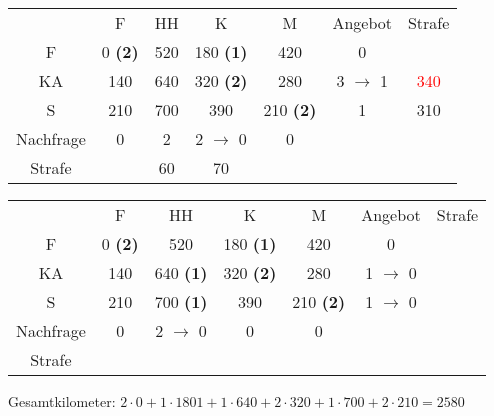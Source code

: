 \documentclass{article}
\begin{document}
	\begin{center}
		\begin{tabular}{c|cccc|cc}
			& \cellcolor{blue!30}F & HH & K & \cellcolor{blue!30}M & Angebot & Strafe \\
			\cline{1-6}
			\rowcolor{blue!30}F & \cellcolor{blue!30}0 \textbf{(2)} & 520 & 180 \textbf{(1)} & \cellcolor{blue!30}420 & 0 & \\
			KA & \cellcolor{blue!30}140 & 640 & 320 \textbf{(2)} & \cellcolor{blue!30}280 & 3 $\to$ 1 & \textcolor{red}{340} \\
			S & \cellcolor{blue!30}210 & 700 & 390 & \cellcolor{blue!30}210 \textbf{(2)} & 1 & 310 \\
			\cline{1-6}
			Nachfrage & \cellcolor{blue!30}0 & 2 & 2 $\to$ 0 & \cellcolor{blue!30}0 & & \\
			Strafe & \cellcolor{blue!30} & 60 & 70 & \cellcolor{blue!30} & & 
		\end{tabular}
	\end{center}
	\begin{center}
		\begin{tabular}{c|cccc|cc}
			& \cellcolor{blue!30}F & HH & \cellcolor{blue!30}K & \cellcolor{blue!30}M & Angebot & Strafe \\
			\cline{1-6}
			\rowcolor{blue!30}F & \cellcolor{blue!30}0 \textbf{(2)} & 520 & 180 \textbf{(1)} & \cellcolor{blue!30}420 & 0 & \\
			KA & \cellcolor{blue!30}140 & 640 \textbf{(1)} & \cellcolor{blue!30}320 \textbf{(2)} & \cellcolor{blue!30}280 & 1 $\to$ 0 & \\
			S & \cellcolor{blue!30}210 & 700 \textbf{(1)} & \cellcolor{blue!30}390 & \cellcolor{blue!30}210 \textbf{(2)} & 1 $\to$ 0 & \\
			\cline{1-6}
			Nachfrage & \cellcolor{blue!30}0 & 2 $\to$ 0 & \cellcolor{blue!30}0 & \cellcolor{blue!30}0 & & \\
			Strafe & \cellcolor{blue!30} & & \cellcolor{blue!30} & \cellcolor{blue!30} & & 
		\end{tabular}
	\end{center}
	Gesamtkilometer: $2\cdot 0 + 1\cdot 1801 + 1 \cdot 640 + 2\cdot 320 + 1\cdot 700 + 2\cdot 210 = 2580$
\end{document}
